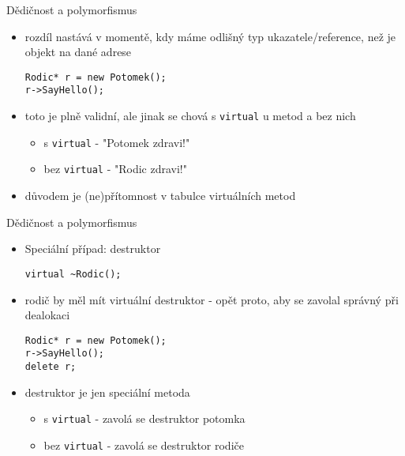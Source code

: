\documentclass{beamer}
\begin{document}
\begin{xframe}{Dědičnost a polymorfismus}
	\begin{itemize}
		\item rozdíl nastává v momentě, kdy máme odlišný typ ukazatele/reference, než je objekt na dané adrese
\begin{lstlisting}[basicstyle=\fontsize{9}{10}\selectfont\ttfamily]
Rodic* r = new Potomek();
r->SayHello();
\end{lstlisting}
		\item toto je plně validní, ale jinak se chová s \texttt{virtual} u metod a bez nich
			\begin{itemize}
				\item s \texttt{virtual} - "Potomek zdravi!"
				\item bez \texttt{virtual} - "Rodic zdravi!"
			\end{itemize}
		\item důvodem je (ne)přítomnost v tabulce virtuálních metod
	\end{itemize}
\end{xframe}


\begin{xframe}{Dědičnost a polymorfismus}
	\begin{itemize}
		\item Speciální případ: destruktor
\begin{lstlisting}[basicstyle=\fontsize{9}{10}\selectfont\ttfamily]
virtual ~Rodic();
\end{lstlisting}
		\item rodič by měl mít virtuální destruktor - opět proto, aby se zavolal správný při dealokaci
\begin{lstlisting}[basicstyle=\fontsize{9}{10}\selectfont\ttfamily]
Rodic* r = new Potomek();
r->SayHello();
delete r;
\end{lstlisting}
		\item destruktor je jen speciální metoda
			\begin{itemize}
				\item s \texttt{virtual} - zavolá se destruktor potomka
				\item bez \texttt{virtual} - zavolá se destruktor rodiče
			\end{itemize}
	\end{itemize}
\end{xframe}
\end{document}
